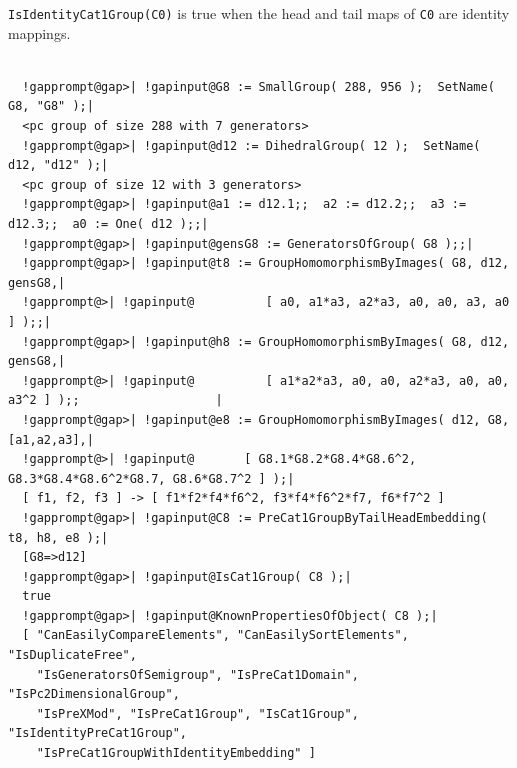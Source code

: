 \documentclass[a4paper,11pt]{report}
\begin{document}
{{{ \texttt{IsIdentityCat1Group(C0)} is true when the head and tail maps of \texttt{C0} are identity mappings. }

 

 
\begin{Verbatim}[commandchars=!@|,fontsize=\small,frame=single,label=Example]
  
  !gapprompt@gap>| !gapinput@G8 := SmallGroup( 288, 956 );  SetName( G8, "G8" );|
  <pc group of size 288 with 7 generators>
  !gapprompt@gap>| !gapinput@d12 := DihedralGroup( 12 );  SetName( d12, "d12" );|
  <pc group of size 12 with 3 generators>
  !gapprompt@gap>| !gapinput@a1 := d12.1;;  a2 := d12.2;;  a3 := d12.3;;  a0 := One( d12 );;|
  !gapprompt@gap>| !gapinput@gensG8 := GeneratorsOfGroup( G8 );;|
  !gapprompt@gap>| !gapinput@t8 := GroupHomomorphismByImages( G8, d12, gensG8,|
  !gapprompt@>| !gapinput@          [ a0, a1*a3, a2*a3, a0, a0, a3, a0 ] );;|
  !gapprompt@gap>| !gapinput@h8 := GroupHomomorphismByImages( G8, d12, gensG8,|
  !gapprompt@>| !gapinput@          [ a1*a2*a3, a0, a0, a2*a3, a0, a0, a3^2 ] );;                   |
  !gapprompt@gap>| !gapinput@e8 := GroupHomomorphismByImages( d12, G8, [a1,a2,a3],|
  !gapprompt@>| !gapinput@       [ G8.1*G8.2*G8.4*G8.6^2, G8.3*G8.4*G8.6^2*G8.7, G8.6*G8.7^2 ] );|
  [ f1, f2, f3 ] -> [ f1*f2*f4*f6^2, f3*f4*f6^2*f7, f6*f7^2 ]
  !gapprompt@gap>| !gapinput@C8 := PreCat1GroupByTailHeadEmbedding( t8, h8, e8 );|
  [G8=>d12]
  !gapprompt@gap>| !gapinput@IsCat1Group( C8 );|
  true
  !gapprompt@gap>| !gapinput@KnownPropertiesOfObject( C8 );|
  [ "CanEasilyCompareElements", "CanEasilySortElements", "IsDuplicateFree", 
    "IsGeneratorsOfSemigroup", "IsPreCat1Domain", "IsPc2DimensionalGroup", 
    "IsPreXMod", "IsPreCat1Group", "IsCat1Group", "IsIdentityPreCat1Group", 
    "IsPreCat1GroupWithIdentityEmbedding" ]
  
\end{Verbatim}
 

}}
\end{document}

